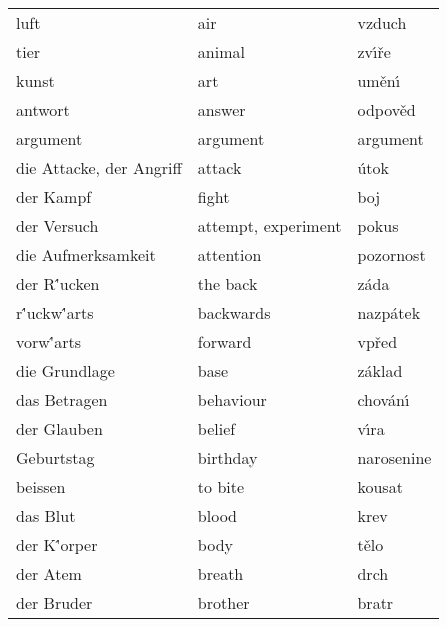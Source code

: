 \documentclass[11pt]{article}
\begin{document}
\begin{longtable}{lll}
 luft                             &  air                      &  vzduch              \\
 tier                             &  animal                   &  zv\'\i\v re         \\
 kunst                            &  art                      &  um\v en\'\i         \\
 antwort                          &  answer                   &  odpov\v ed          \\
 argument                         &  argument                 &  argument            \\
 die Attacke, der Angriff         &  attack                   &  \'utok              \\
 der Kampf                        &  fight                    &  boj                 \\
 der Versuch                      &  attempt, experiment      &  pokus               \\
 die Aufmerksamkeit               &  attention                &  pozornost           \\
 der R\''ucken                    &  the back                 &  z\'ada              \\
 r\''uckw\''arts                  &  backwards                &  nazp\'atek          \\
 vorw\''arts                      &  forward                  &  vp\v red            \\
 die Grundlage                    &  base                     &  z\'aklad            \\
 das Betragen                     &  behaviour                &  chov\'an\'\i        \\
 der Glauben                      &  belief                   &  v\'\i ra            \\
 Geburtstag                       &  birthday                 &  narosenine          \\
 beissen                          &  to bite                  &  kousat              \\
 das Blut                         &  blood                    &  krev                \\
 der K\''orper                    &  body                     &  t\v elo             \\
 der Atem                         &  breath                   &  drch                \\
 der Bruder                       &  brother                  &  bratr               \\

\end{longtable}
\end{document}
